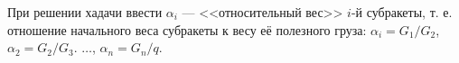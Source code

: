 При решении хадачи ввести $\alpha _i$ --- <<относительный вес>> $i$-й субракеты,
т. е. отношение начального веса субракеты к весу её полезного груза:
$\alpha _i = G_1/G_2$, $\alpha _2 = G_2/G_3$. $\dots$, $\alpha _n = G_n/q$.
